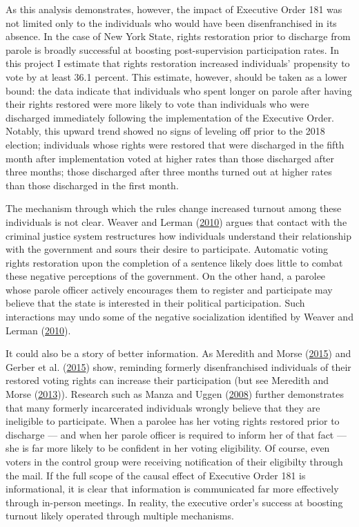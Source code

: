\documentclass[
  12pt,
]{article}
\begin{document}
As this analysis demonstrates, however, the impact of Executive Order 181 was not limited only to the individuals who would have been disenfranchised in its absence. In the case of New York State, rights restoration prior to discharge from parole is broadly successful at boosting post-supervision participation rates. In this project I estimate that rights restoration increased individuals' propensity to vote by at least 36.1 percent. This estimate, however, should be taken as a lower bound: the data indicate that individuals who spent longer on parole after having their rights restored were more likely to vote than individuals who were discharged immediately following the implementation of the Executive Order. Notably, this upward trend showed no signs of leveling off prior to the 2018 election; individuals whose rights were restored that were discharged in the fifth month after implementation voted at higher rates than those discharged after three months; those discharged after three months turned out at higher rates than those discharged in the first month.

The mechanism through which the rules change increased turnout among these individuals is not clear. Weaver and Lerman (\protect\hyperlink{ref-Weaver2010}{2010}) argues that contact with the criminal justice system restructures how individuals understand their relationship with the government and sours their desire to participate. Automatic voting rights restoration upon the completion of a sentence likely does little to combat these negative perceptions of the government. On the other hand, a parolee whose parole officer actively encourages them to register and participate may believe that the state is interested in their political participation. Such interactions may undo some of the negative socialization identified by Weaver and Lerman (\protect\hyperlink{ref-Weaver2010}{2010}).

It could also be a story of better information. As Meredith and Morse (\protect\hyperlink{ref-Meredith2015}{2015}) and Gerber et al. (\protect\hyperlink{ref-Gerber2015}{2015}) show, reminding formerly disenfranchised individuals of their restored voting rights can increase their participation (but see Meredith and Morse (\protect\hyperlink{ref-Meredith2013}{2013})). Research such as Manza and Uggen (\protect\hyperlink{ref-locked_out}{2008}) further demonstrates that many formerly incarcerated individuals wrongly believe that they are ineligible to participate. When a parolee has her voting rights restored prior to discharge --- and when her parole officer is required to inform her of that fact --- she is far more likely to be confident in her voting eligibility. Of course, even voters in the control group were receiving notification of their eligibilty through the mail. If the full scope of the causal effect of Executive Order 181 is informational, it is clear that information is communicated far more effectively through in-person meetings. In reality, the executive order's success at boosting turnout likely operated through multiple mechanisms.
\end{document}
